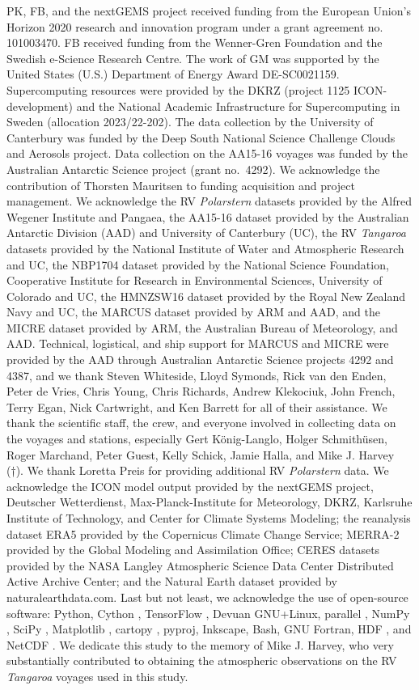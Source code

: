 \documentclass[draft]{agujournal2019}
\begin{document}
PK, FB, and the nextGEMS project received funding from the European Union’s Horizon 2020 research and innovation program under a grant agreement no. 101003470. FB received funding from the Wenner-Gren Foundation and the Swedish e-Science Research Centre. The work of GM was supported by the United States (U.S.) Department of Energy Award DE-SC0021159. Supercomputing resources were provided by the DKRZ (project 1125 ICON-development) and the National Academic Infrastructure for Supercomputing in Sweden (allocation 2023/22-202). The data collection by the University of Canterbury was funded by the Deep South National Science Challenge Clouds and Aerosols project. Data collection on the AA15-16 voyages was funded by the Australian Antarctic Science project (grant no.~4292). We acknowledge the contribution of Thorsten Mauritsen to funding acquisition and project management. We acknowledge the RV \emph{Polarstern} datasets provided by the Alfred Wegener Institute and Pangaea, the AA15-16 dataset provided by the Australian Antarctic Division (AAD) and University of Canterbury (UC), the RV \emph{Tangaroa} datasets provided by the National Institute of Water and Atmospheric Research and UC, the NBP1704 dataset provided by the National Science Foundation, Cooperative Institute for Research in Environmental Sciences, University of Colorado and UC, the HMNZSW16 dataset provided by the Royal New Zealand Navy and UC, the MARCUS dataset provided by ARM and AAD, and the MICRE dataset provided by ARM, the Australian Bureau of Meteorology, and AAD. Technical, logistical, and ship support for MARCUS and MICRE were provided by the AAD through Australian Antarctic Science projects 4292 and 4387, and we thank Steven Whiteside, Lloyd Symonds, Rick van den Enden, Peter de Vries, Chris Young, Chris Richards, Andrew Klekociuk, John French, Terry Egan, Nick Cartwright, and Ken Barrett for all of their assistance. We thank the scientific staff, the crew, and everyone involved in collecting data on the voyages and stations, especially Gert König-Langlo, Holger Schmithüsen, Roger Marchand, Peter Guest, Kelly Schick, Jamie Halla, and Mike J. Harvey (†). We thank Loretta Preis for providing additional RV \emph{Polarstern} data. We acknowledge the ICON model output provided by the nextGEMS project, Deutscher Wetterdienst, Max-Planck-Institute for Meteorology, DKRZ, Karlsruhe Institute of Technology, and Center for Climate Systems Modeling; the reanalysis dataset ERA5 provided by the Copernicus Climate Change Service; MERRA-2 provided by the Global Modeling and Assimilation Office; CERES datasets provided by the NASA Langley Atmospheric Science Data Center Distributed Active Archive Center; and the Natural Earth dataset provided by naturalearthdata.com. Last but not least, we acknowledge the use of open-source software: Python, Cython \cite{behnel2011}, TensorFlow \cite{abadi2016}, Devuan GNU+Linux, parallel \cite{tange2011}, NumPy \cite{harris2020}, SciPy \cite{virtanen2020}, Matplotlib \cite{hunter2007}, cartopy \cite{cartopy}, pyproj, Inkscape, Bash, GNU Fortran, HDF \cite{folk1999}, and NetCDF \cite{rew1990}. We dedicate this study to the memory of Mike J. Harvey, who very substantially contributed to obtaining the atmospheric observations on the RV \emph{Tangaroa} voyages used in this study.


\end{document}

